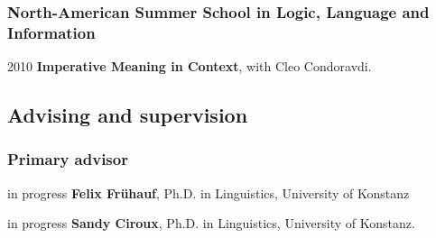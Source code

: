 \subsubsection*{North-American Summer School in Logic, Language and Information}
\begin{dated}
	\item[2010] \textbf{Imperative Meaning in Context}, with Cleo Condoravdi.
\end{dated}
\subsection*{Advising and supervision}
\subsubsection*{Primary advisor}
\begin{dated}
	\item[in progress]
		\textbf{Felix Frühauf},
		Ph.D. in Linguistics,
		University of Konstanz
	\item[in progress]
		\textbf{Sandy Ciroux},
		Ph.D. in Linguistics,
		University of Konstanz.
\end{dated}
